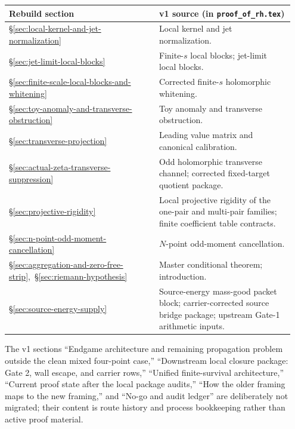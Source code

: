\documentclass[11pt,a4paper]{amsart}
\numberwithin{equation}{section}
\theoremstyle{plain}
\theoremstyle{definition}
\begin{document}
\medskip
\noindent\begin{tabular}{@{}p{0.50\linewidth} p{0.45\linewidth}@{}}
\hline
\textbf{Rebuild section} & \textbf{v1 source (in \texttt{proof\_of\_rh.tex})} \\
\hline
\S\ref{sec:local-kernel-and-jet-normalization}
& Local kernel and jet normalization. \\
\S\ref{sec:jet-limit-local-blocks}
& Finite-\(s\) local blocks; jet-limit local blocks. \\
\S\ref{sec:finite-scale-local-blocks-and-whitening}
& Corrected finite-\(s\) holomorphic whitening. \\
\S\ref{sec:toy-anomaly-and-transverse-obstruction}
& Toy anomaly and transverse obstruction. \\
\S\ref{sec:transverse-projection}
& Leading value matrix and canonical calibration. \\
\S\ref{sec:actual-zeta-transverse-suppression}
& Odd holomorphic transverse channel; corrected fixed-target quotient
  package. \\
\S\ref{sec:projective-rigidity}
& Local projective rigidity of the one-pair and multi-pair families;
  finite coefficient table contracts. \\
\S\ref{sec:n-point-odd-moment-cancellation}
& \(N\)-point odd-moment cancellation. \\
\S\ref{sec:aggregation-and-zero-free-strip},\
\S\ref{sec:riemann-hypothesis}
& Master conditional theorem; introduction. \\
\S\ref{sec:source-energy-supply}
& Source-energy mass-good packet block; carrier-corrected
  source bridge package; upstream Gate-1 arithmetic inputs. \\
\hline
\end{tabular}
\medskip

The v1 sections ``Endgame architecture and remaining propagation
problem outside the clean mixed four-point case,'' ``Downstream local
closure package: Gate 2, wall escape, and carrier rows,'' ``Unified
finite-survival architecture,'' ``Current proof state after the local
package audits,'' ``How the older framing maps to the new framing,''
and ``No-go and audit ledger'' are deliberately not migrated; their
content is route history and process bookkeeping rather than active
proof material.
\end{document}
